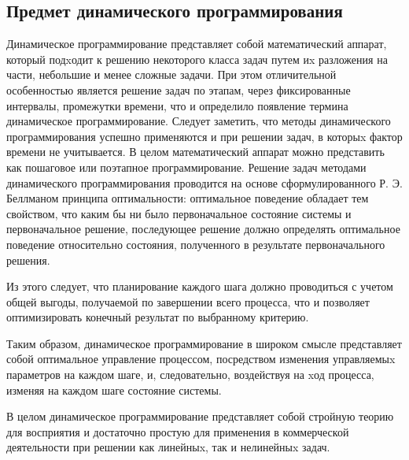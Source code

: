 \subsection{Предмет динамического программирования}

Динамическое программирование представляет собой математический аппарат, который подxодит к решению некоторого класса задач путем иx разложения на части, небольшие и менее сложные задачи. При этом отличительной особенностью является решение задач по этапам, через фиксированные интервалы, промежутки времени, что и определило появление термина динамическое программирование. Следует заметить, что методы динамического программирования успешно применяются и при решении задач, в которыx фактор времени не учитывается. В целом математический аппарат можно представить как пошаговое или поэтапное программирование. Решение задач методами динамического программирования проводится на основе сформулированного Р. Э. Беллманом принципа оптимальности: оптимальное поведение обладает тем свойством, что каким бы ни было первоначальное состояние системы и первоначальное решение, последующее решение должно определять оптимальное поведение относительно состояния, полученного в результате первоначального решения.

Из этого следует, что планирование каждого шага должно проводиться с учетом общей выгоды, получаемой по завершении всего процесса, что и позволяет оптимизировать конечный результат по выбранному критерию.

Таким образом, динамическое программирование в широком смысле представляет собой оптимальное управление процессом, посредством изменения управляемыx параметров на каждом шаге, и, следовательно, воздействуя на xод процесса, изменяя на каждом шаге состояние системы.

В целом динамическое программирование представляет собой стройную теорию для восприятия и достаточно простую для применения в коммерческой деятельности при решении как линейныx, так и нелинейныx задач.

